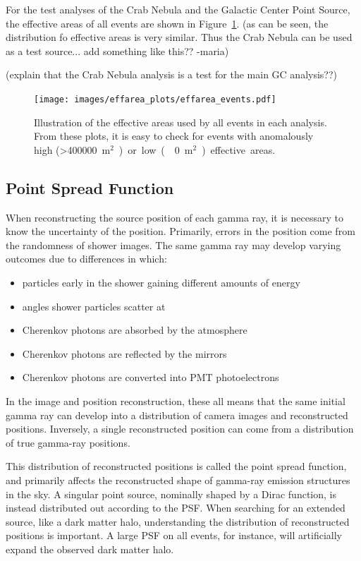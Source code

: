     For the test analyses of the Crab Nebula and the Galactic Center Point Source, the effective areas of all events are shown in Figure~\ref{fig:effarea_usage}.
    {\color{red}(as can be seen, the distribution fo effective areas is very similar. Thus the Crab Nebula can be used as a test source... add something like this?? -maria)}
    {\color{red}(explain that the Crab Nebula analysis is a test for the main GC analysis??)

    \begin{figure}[!t]
      \centering
      \texttt{[image: images/effarea\_plots/effarea\_events.pdf]}
      \caption[Effective Areas Used]{
      Illustration of the effective areas used by all events in each analysis.
      From these plots, it is easy to check for events with anomalously high (>\SI{400000}{m${}^2$}) or low (\nicetilde\SI{0}{m${}^2$}) effective areas.
      }
      \label{fig:effarea_usage}
    \end{figure}
  
  \FloatBarrier

  \subsection{Point Spread Function}\label{subsec:psf}

    When reconstructing the source position of each gamma ray, it is necessary to know the uncertainty of the position.
    Primarily, errors in the position come from the randomness of shower images.
    The same gamma ray may develop varying outcomes due to differences in which:
    \begin{itemize}[label=$\bullet$,noitemsep]
      \item particles early in the shower gaining different amounts of energy
      \item angles shower particles scatter at
      \item Cherenkov photons are absorbed by the atmosphere
      \item Cherenkov photons are reflected by the mirrors
      \item Cherenkov photons are converted into PMT photoelectrons
    \end{itemize}
    In the image and position reconstruction, these all means that the same initial gamma ray can develop into a distribution of camera images and reconstructed positions.
    Inversely, a single reconstructed position can come from a distribution of true gamma-ray positions.

    This distribution of reconstructed positions is called the point spread function, and primarily affects the reconstructed shape of gamma-ray emission structures in the sky.
    A singular point source, nominally shaped by a Dirac function, is instead distributed out according to the PSF.
    When searching for an extended source, like a dark matter halo, understanding the distribution of reconstructed positions is important.
    A large PSF on all events, for instance, will artificially expand the observed dark matter halo.

}
